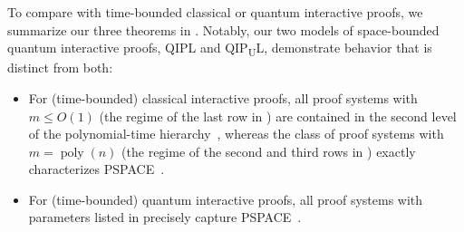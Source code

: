 \documentclass[10pt,a4paper]{article}
\numberwithin{equation}{section}
\numberwithin{figure}{section}
\newcommand{\QIPL}{\textnormal{\textsf{QIPL}}\xspace}
\newcommand{\QIPUL}{\texorpdfstring{\textnormal{\textsf{QIP}\textsubscript{\textnormal{U}}\textsf{L}}}\xspace}
\newcommand{\PSPACE}{\textnormal{\textsf{PSPACE}}\xspace}
\DeclareMathOperator\poly{poly}
\begin{document}
To compare with time-bounded classical or quantum interactive proofs, we summarize our three theorems in . Notably, our two models of space-bounded quantum interactive proofs, \QIPL{} and \QIPUL{}, demonstrate behavior that is distinct from both: 
\begin{itemize}[itemsep=0.33em, topsep=0.33em, parsep=0.33em]
    \item For (time-bounded) classical interactive proofs, all proof systems with $m \leq O(1)$ (the regime of the last row in ) are contained in the second level of the polynomial-time hierarchy~\cite{Babai85,GS86}, whereas the class of proof systems with $m=\poly(n)$ (the regime of the second and third rows in ) exactly characterizes \PSPACE{}~\cite{LFKN92,Shamir92}. 
    \item For (time-bounded) quantum interactive proofs, all proof systems with parameters listed in  precisely capture \PSPACE{}~\cite{Wat99QIP,KW00,JJUW11}.
\end{itemize}
\end{document}
